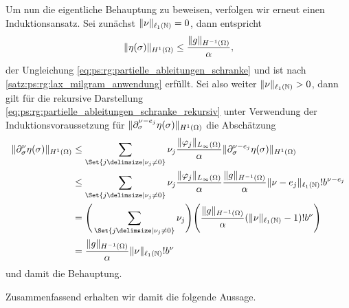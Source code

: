 \begin{Satz}
\begin{Beweis}
        Um nun die eigentliche Behauptung zu beweisen, verfolgen wir erneut einen Induktionsansatz.
        Sei zunächst $\lVert\nu\rVert_{\ell_{1}(\mathbb{N})} = 0$, dann entspricht
        \begin{equation}
            \lVert\eta(\sigma)\rVert_{H^{1}(\Omega)} \leq \frac{\lVert g\rVert_{H^{-1}(\Omega)}}{\alpha},
        \end{equation}
        der Ungleichung \cref{eq:ps:rg:partielle_ableitungen_schranke} und ist nach \cref{satz:ps:rg:lax_milgram_anwendung} erfüllt.
        Sei also weiter $\lVert\nu\rVert_{\ell_{1}(\mathbb{N})} > 0$, dann gilt für die rekursive Darstellung \cref{eq:ps:rg:partielle_ableitungen_schranke_rekursiv} unter Verwendung der Induktionsvoraussetzung für $\lVert\partial^{\nu - e_{j}}_{\sigma} \eta(\sigma)\rVert_{H^{1}(\Omega)}$ die Abschätzung
        \begin{align}
            \norm{\partial^{\nu}_{\sigma} \eta(\sigma)}_{H^{1}(\Omega)}
            &\leq
            \sum_{\Set{j \given \nu_{j} \neq 0}} \nu_{j} \frac{\norm{\varphi_{j}}_{L_{\infty}(\Omega)}}{\alpha} \norm{\partial^{\nu - e_{j}}_{\sigma} \eta(\sigma)}_{H^{1}(\Omega)}
            \\&\leq
            \sum_{\Set{j \given \nu_{j} \neq 0}} \nu_{j} \frac{\norm{\varphi_{j}}_{L_{\infty}(\Omega)}}{\alpha} \frac{\norm{g}_{H^{-1}(\Omega)}}{\alpha} \norm{\nu - e_{j}}_{\ell_{1}(\mathbb{N})}! b^{\nu - e_{j}}
            \\&=
            \Bigg( \sum_{\Set{j \given \nu_{j} \neq 0}} \nu_{j} \Bigg) \Bigg( \frac{\norm{g}_{H^{-1}(\Omega)}}{\alpha} (\norm{\nu}_{\ell_{1}(\mathbb{N})} - 1)! b^{\nu} \Bigg)
            \\&=
            \frac{\norm{g}_{H^{-1}(\Omega)}}{\alpha} \norm{\nu}_{\ell_{1}(\mathbb{N})}! b^{\nu}
         \end{align}
         und damit die Behauptung.
    \end{Beweis}
\end{Satz}

Zusammenfassend erhalten wir damit die folgende Aussage.

